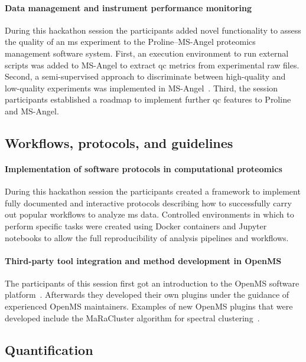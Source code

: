 \documentclass[fontsize=11pt, paper=a4, titlepage=false]{scrartcl}
\begin{document}
\paragraph{Data management and instrument performance monitoring}

During this hackathon session the participants added novel functionality to 
assess the quality of an \gls{ms} experiment to the Proline--MS-Angel 
proteomics management software system. First, an execution environment to run 
external scripts was added to MS-Angel to extract \gls{qc} metrics from 
experimental raw files. Second, a semi-supervised approach to discriminate 
between high-quality and low-quality experiments was implemented in 
MS-Angel~\autocite{Solovyeva2018}. Third, the session participants established 
a roadmap to implement further \gls{qc} features to Proline and MS-Angel.

\subsection{Workflows, protocols, and guidelines}

\paragraph{Implementation of software protocols in computational proteomics}

During this hackathon session the participants created a framework to implement 
fully documented and interactive protocols describing how to successfully carry 
out popular workflows to analyze \gls{ms} data. Controlled 
environments in which to perform specific tasks were created using Docker 
containers and Jupyter notebooks to allow the full reproducibility of analysis 
pipelines and workflows.

\paragraph{Third-party tool integration and method development in OpenMS}

The participants of this session first got an introduction to the OpenMS 
software platform~\autocite{Rost2016}. Afterwards they developed their own 
plugins under the guidance of experienced OpenMS maintainers. Examples of new 
OpenMS plugins that were developed include the \mbox{MaRaCluster} algorithm for 
spectral clustering~\autocite{The2016}.

\subsection{Quantification}
\end{document}

